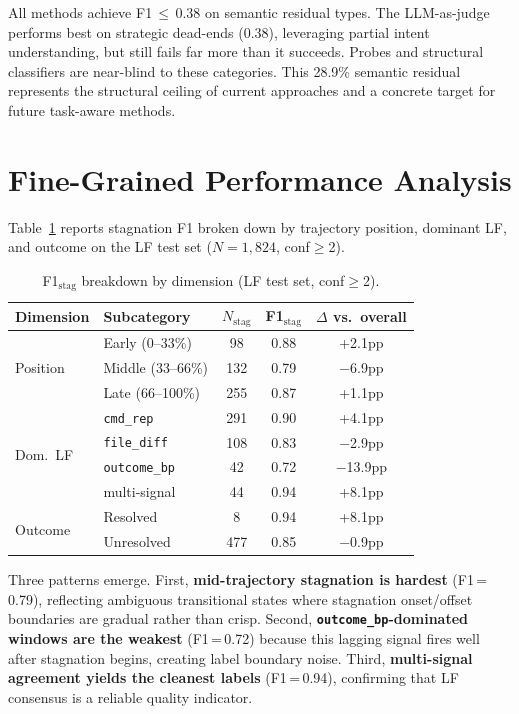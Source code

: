 \documentclass[11pt]{article}
\begin{document}
All methods achieve F1$\,\leq\,$0.38 on semantic residual types. The LLM-as-judge performs best on strategic dead-ends (0.38), leveraging partial intent understanding, but still fails far more than it succeeds. Probes and structural classifiers are near-blind to these categories. This 28.9\% semantic residual represents the structural ceiling of current approaches and a concrete target for future task-aware methods.

\section{Fine-Grained Performance Analysis}
\label{sec:breakdown}

Table~\ref{tab:breakdown} reports stagnation F1 broken down by trajectory position, dominant LF, and outcome on the LF test set ($N\!=\!1{,}824$, conf$\geq$2).

\begin{table}[t]
\centering
\small
\caption{F1$_\text{stag}$ breakdown by dimension (LF test set, conf$\geq$2).}
\label{tab:breakdown}
\begin{tabular}{llccc}
\toprule
Dimension & Subcategory & $N_\text{stag}$ & F1$_\text{stag}$ & $\Delta$ vs.\ overall \\
\midrule
\multirow{3}{*}{Position} & Early (0--33\%) & 98 & 0.88 & +2.1pp \\
 & Middle (33--66\%) & 132 & 0.79 & $-$6.9pp \\
 & Late (66--100\%) & 255 & 0.87 & +1.1pp \\
\midrule
\multirow{4}{*}{Dom.\ LF} & \texttt{cmd\_rep} & 291 & 0.90 & +4.1pp \\
 & \texttt{file\_diff} & 108 & 0.83 & $-$2.9pp \\
 & \texttt{outcome\_bp} & 42 & 0.72 & $-$13.9pp \\
 & multi-signal & 44 & 0.94 & +8.1pp \\
\midrule
\multirow{2}{*}{Outcome} & Resolved & 8 & 0.94 & +8.1pp \\
 & Unresolved & 477 & 0.85 & $-$0.9pp \\
\bottomrule
\end{tabular}
\end{table}

Three patterns emerge. First, \textbf{mid-trajectory stagnation is hardest} (F1\,=\,0.79), reflecting ambiguous transitional states where stagnation onset/offset boundaries are gradual rather than crisp. Second, \textbf{\texttt{outcome\_bp}-dominated windows are the weakest} (F1\,=\,0.72) because this lagging signal fires well after stagnation begins, creating label boundary noise. Third, \textbf{multi-signal agreement yields the cleanest labels} (F1\,=\,0.94), confirming that LF consensus is a reliable quality indicator.
\end{document}
